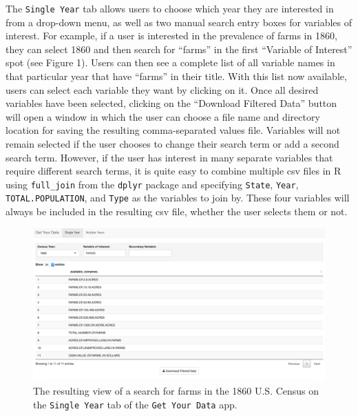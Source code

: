 \documentclass[11pt,]{article}
\begin{document}
The \texttt{Single\ Year} tab allows users to choose which year they are
interested in from a drop-down menu, as well as two manual search entry
boxes for variables of interest. For example, if a user is interested in
the prevalence of farms in 1860, they can select 1860 and then search
for ``farms'' in the first ``Variable of Interest'' spot (see Figure 1).
Users can then see a complete list of all variable names in that
particular year that have ``farms'' in their title. With this list now
available, users can select each variable they want by clicking on it.
Once all desired variables have been selected, clicking on the
``Download Filtered Data'' button will open a window in which the user
can choose a file name and directory location for saving the resulting
comma-separated values file. Variables will not remain selected if the
user chooses to change their search term or add a second search term.
However, if the user has interest in many separate variables that
require different search terms, it is quite easy to combine multiple csv
files in R using \texttt{full\_join} from the \texttt{dplyr} package and
specifying \texttt{State}, \texttt{Year}, \texttt{TOTAL.POPULATION}, and
\texttt{Type} as the variables to join by. These four variables will
always be included in the resulting csv file, whether the user selects
them or not.

\begin{figure}[htbp]
\centering
\includegraphics{./figures/app-sshot-farms.png}
\caption{The resulting view of a search for farms in the 1860 U.S.
Census on the \texttt{Single\ Year} tab of the \texttt{Get\ Your\ Data}
app.}
\end{figure}
\end{document}
